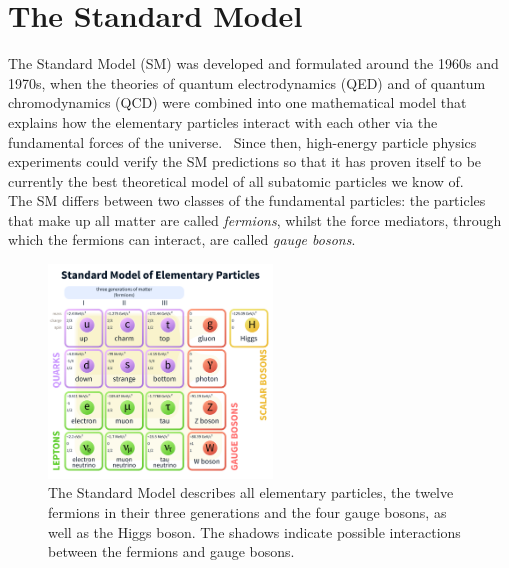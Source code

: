 \section{The Standard Model}
\label{StandardModel}
The Standard Model (SM) was developed and formulated around the 1960s and 1970s, when the theories of quantum electrodynamics (QED) and of quantum chromodynamics (QCD) were combined into one mathematical model that explains how the elementary particles interact with each other via the fundamental forces of the universe.~\cite[p. 3]{Griffiths}
Since then, high-energy particle physics experiments could verify the SM predictions so that it has proven itself to be currently the best theoretical model of all subatomic particles we know of.\\
The SM differs between two classes of the fundamental particles: 
the particles that make up all matter are called \textit{fermions}, whilst the force mediators, through which the fermions can interact, are called \textit{gauge bosons}.
\begin{figure}[h]
\centering
\includegraphics[width=0.53\textwidth]{Figures/Standard_Model_of_Elementary_Particles.png}
\caption[Standard Model]{The Standard Model describes all elementary particles, the twelve fermions in their three generations and the four gauge bosons, as well as the Higgs boson.
The shadows indicate possible interactions between the fermions and gauge bosons.~\cite{SM}}
\label{fig:SM}
\end{figure}

